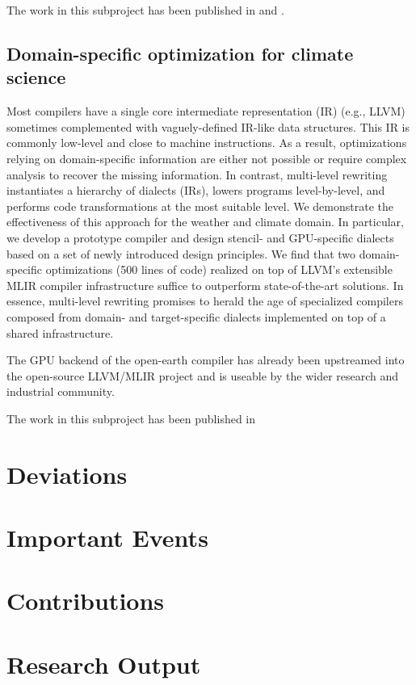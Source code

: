 \documentclass[11pt, manuscript,\review anonymous]{acmart}
\begin{document}
The work in this subproject has been published in \citet{grosser2020fast} and
\citet{pichanatan2021}.

\subsection{Domain-specific optimization for climate science}

Most compilers have a single core intermediate representation (IR) (e.g., LLVM)
sometimes complemented with vaguely-defined IR-like data structures. This IR is
commonly low-level and close to machine instructions. As a result,
optimizations relying on domain-specific information are either not possible or
require complex analysis to recover the missing information. In contrast,
multi-level rewriting instantiates a hierarchy of dialects (IRs), lowers
programs level-by-level, and performs code transformations at the most suitable
level. We demonstrate the effectiveness of this approach for the weather and
climate domain. In particular, we develop a prototype compiler and design
stencil- and GPU-specific dialects based on a set of newly introduced design
principles. We find that two domain-specific optimizations (500 lines of code)
realized on top of LLVM’s extensible MLIR compiler infrastructure suffice to
outperform state-of-the-art solutions. In essence, multi-level rewriting
promises to herald the age of specialized compilers composed from domain- and
target-specific dialects implemented on top of a shared infrastructure.

The GPU backend of the open-earth compiler has already been upstreamed into
the open-source LLVM/MLIR project and is useable by the wider research
and industrial community.

The work in this subproject has been published in \citet{gysi2020ooc}

\section{Deviations}

\section{Important Events}

\section{Contributions}

\section{Research Output}
\end{document}
